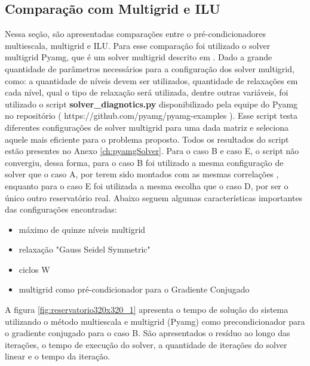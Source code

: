 





\subsection{Comparação com Multigrid e ILU}

Nessa seção, são apresentadas comparações entre o pré-condicionadores multiescala, multigrid e ILU. Para esse comparação foi utilizado o solver multigrid Pyamg, que é um solver multigrid  descrito em \cite{OlSc2018}. Dado a grande quantidade de parâmetros necessários para a configuração dos solver multigrid, como: a quantidade de níveis devem ser utilizados, quantidade de relaxações em cada nível, qual o tipo de relaxação será utilizada, dentre outras variáveis, foi utilizado o script \textbf{solver\_diagnotics.py} disponibilizado pela equipe do Pyamg no repositório ( https://github.com/pyamg/pyamg-examples ). Esse script testa diferentes configurações de solver multigrid para uma dada matriz e seleciona aquele mais eficiente para o problema proposto. Todos os resultados do script estão presentes no Anexo \ref{ch:pyamgSolver}. Para o caso B e caso E, o script não convergiu, dessa forma, para o caso B foi utilizado a mesma configuração de solver que o caso A, por terem sido montados com as mesmas correlações , enquanto para o caso E foi utilizada a mesma escolha que o caso D, por ser o único outro reservatório real. Abaixo seguem algumas características importantes das configurações encontradas:

\begin{itemize}
    \item máximo de quinze níveis multigrid
    \item relaxação "Gauss Seidel Symmetric" 
    \item ciclos W
    \item multigrid como pré-condicionador para o Gradiente Conjugado
\end{itemize}


A figura \ref{fig:reservatorio320x320_1} apresenta o tempo de solução do sistema utilizando o método multiescala e multigrid (Pyamg) como precondicionador para o gradiente conjugado para o caso B. São apresentados o resíduo ao longo das iterações, o tempo de execução do solver, a quantidade de iterações do solver linear e o tempo da iteração.


